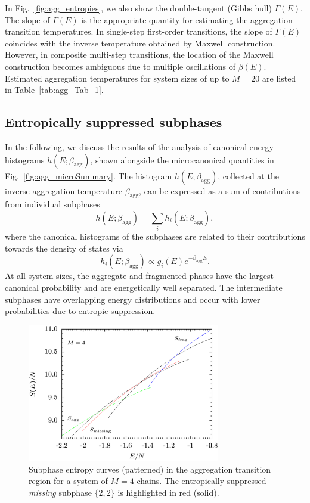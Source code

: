 \documentclass[12pt]{report}
\begin{document}
\newpage

%
In Fig.~\ref{fig:agg_entropies}, we also show the double-tangent (Gibbs hull) $\Gamma(E)$. The slope of $\Gamma(E)$ is the appropriate quantity for estimating the aggregation transition temperatures. In single-step first-order transitions, the slope of $\Gamma(E)$ coincides with the inverse temperature obtained by Maxwell construction. However, in composite multi-step  transitions, the location of the Maxwell construction becomes ambiguous due to multiple oscillations of $\beta(E)$. Estimated aggregation temperatures for system sizes of up to $M=20$ are listed in Table~\ref{tab:agg_Tab_1}.
%

\subsection{Entropically suppressed subphases}
%
In the following, we discuss the results of the analysis of canonical energy histograms $h(E;\beta_{\mathrm{agg}})$, shown alongside the microcanonical quantities in Fig.~\ref{fig:agg_microSummary}. The histogram
\newline
\noindent
$h(E;\beta_{\mathrm{agg}})$, collected at the inverse aggregation temperature $\beta_{\mathrm{agg}}$, can be expressed as a sum
of contributions from individual subphases
%
\begin{equation}
h(E;\beta_{\mathrm{agg}}) = \sum_{i}h_{i}(E;\beta_{\mathrm{agg}}),
\end{equation}  
%
where the canonical histograms of the subphases are related to their contributions towards the density of states via
%
\begin{equation}
h_{i}(E;\beta_{\mathrm{agg}}) \propto g_{i}(E)e^{-\beta_{\mathrm{agg}}E}.
\end{equation}
%
At all system sizes, the aggregate and fragmented phases have the largest canonical probability and are energetically well separated. The intermediate subphases have overlapping energy distributions and occur with lower probabilities due to entropic suppression.
%

%
\begin{figure}
\center
\includegraphics[width = 0.75\textwidth, angle
=0]{chapter7Figs/microEntropy.eps}
\caption{\label{fig:agg_entropyMissing}%
Subphase entropy curves (patterned) in the aggregation transition region for a system of $M=4$ chains. The entropically suppressed \textit{missing} subphase $\{2,2\}$ is highlighted in red (solid).}
\end{figure}
%
\end{document}

